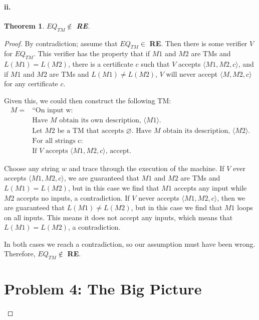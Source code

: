 \documentclass[10pt,letter]{article}
\newtheorem*{thm}{Theorem}
\begin{document}
\paragraph{ii.}
\begin{thm} $EQ_{TM} \not \in $ \textbf{RE}. \end{thm}
\begin{proof} 

By contradiction; assume that $EQ_{TM} \in$ \textbf{RE}. Then there is some verifier $V$ for $EQ_{TM}$. This verifier has the property that if $M1$ and $M2$ are TMs and $L(M1) = L(M2)$, there is a certificate $c$ such that $V$ accepts $\langle M1, M2, c \rangle$, and if $M1$ and $M2$ are TMs and $L(M1) \not = L(M2)$, $V$ will never accept $\langle M, M2, c \rangle$ for any certificate $c$.

Given this, we could then construct the following TM:
\begin{align*}
M = &\text{“On input w:}\\
&\text{Have $M$ obtain its own description, $\langle M1 \rangle$.}\\
&\text{Let $M2$ be a TM that accepts $\varnothing$. Have $M$ obtain its description, $\langle M2 \rangle$.}\\
&\text{For all strings c:}\\
&\text{If $V$ accepts $\langle M1, M2, c \rangle$, accept.}
\end{align*}

Choose any string $w$ and trace through the execution of the machine. If $V$ ever accepts $\langle M1, M2, c \rangle$, we are guaranteed that $M1$ and $M2$ are TMs and $L(M1) = L(M2)$, but in this case we find that $M1$ accepts any input while $M2$ accepts no inputs, a contradiction. If $V$ never accepts $\langle M1, M2, c \rangle$, then we are guaranteed that $L(M1) \not = L(M2)$, but in this case we find that $M1$ loops on all inputs. This means it does not accept any inputs, which means that $L(M1) = L(M2)$, a contradiction.

In both cases we reach a contradiction, so our assumption must have been wrong. Therefore, $EQ_{TM} \not \in$ \textbf{RE}.

\section*{Problem 4: The Big Picture}


\end{proof}
\end{document}
